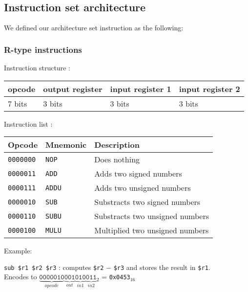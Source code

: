 \documentclass[a4paper]{report}
\begin{document}
\subsection{Instruction set architecture}

We defined our architecture set instruction as the following:

\subsubsection{R-type instructions}

Instruction structure :

\begin{center}
	\begin{tabular}{|l|l|l|l|}
		\hline
		opcode & output register & input register 1 & input register 2 \\
		\hline
		7 bits & 3 bits & 3 bits & 3 bits \\
		\hline
	\end{tabular}
\end{center}

Instruction list :

\begin{center}
	\begin{tabular}{|l|l|l|}
		\hline
		Opcode & Mnemonic & Description \\
		\hline \hline
		\texttt{0000000} & \texttt{NOP} &  Does nothing \\
		\texttt{0000011} & \texttt{ADD} &  Adds two signed numbers \\
		\texttt{0000111} & \texttt{ADDU} & Adds two unsigned numbers \\
		\texttt{0000010} & \texttt{SUB} &  Substracts two signed numbers \\
		\texttt{0000110} & \texttt{SUBU} & Substracts two unsigned numbers \\
		\texttt{0000100} & \texttt{MULU} & Multiplied two unsigned numbers \\
		\hline
	\end{tabular}
\end{center}

Example:

\texttt{sub \$r1 \$r2 \$r3} : computes \texttt{\$r2} $-$ \texttt{\$r3} and stores the
result in \texttt{\$r1}. \\
Encodes to ${
	\underbrace{\texttt{0000010}}_{opcode}
	\underbrace{\texttt{001}}_{out}
	\underbrace{\texttt{010}}_{in 1}
	\underbrace{\texttt{011}}_{in 2}\mbox{}_2 %
}$ = \texttt{0x0453}$_{16}$
\end{document}

